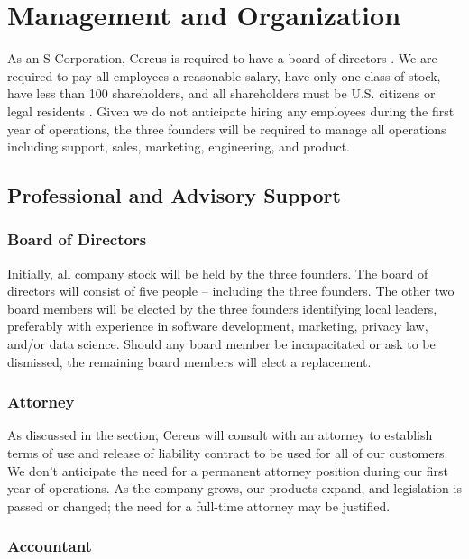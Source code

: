 {\let\cleardoublepage\relax \chapter*{Management and Organization}}

As an S Corporation, Cereus is required to have a board of directors \cite{UpCounsel.2020}. We are required to pay all employees a reasonable salary, have only one class of stock, have less than 100 shareholders, and all shareholders must be U.S. citizens or legal residents \cite{wave.2019}. Given we do not anticipate hiring any employees during the first year of operations, the three founders will be required to manage all operations including support, sales, marketing, engineering, and product. 

\section{Professional and Advisory Support}

\subsection{Board of Directors}

Initially, all company stock will be held by the three founders. The board of directors will consist of five people -- including the three founders. The other two board members will be elected by the three founders identifying local leaders, preferably with experience in software development, marketing, privacy law, and/or data science. Should any board member be incapacitated or ask to be dismissed, the remaining board members will elect a replacement.

\subsection{Attorney}

As discussed in the  section, Cereus will consult with an attorney to establish terms of use and release of liability contract to be used for all of our customers. We don't anticipate the need for a permanent attorney position during our first year of operations. As the company grows, our products expand, and legislation is passed or changed; the need for a full-time attorney may be justified. 

\subsection{Accountant}

